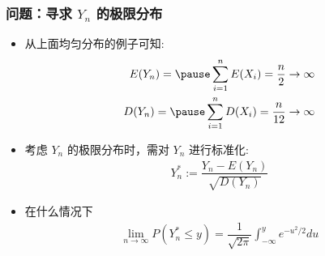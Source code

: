 \begin{frame}
	\frametitle{问题：寻求 $Y_n$ 的极限分布}
	\begin{itemize}[<+-|alert@+>]
		\item 从上面均匀分布的例子可知:
		\begin{eqnarray*}
			E(Y_n)=\pause \sum_{i=1}^nE(X_i)=\dfrac{n}{2}\rightarrow\infty\\
			D(Y_n)=\pause \sum_{i=1}^n D(X_i)=\dfrac{n}{12}\rightarrow\infty
		\end{eqnarray*}
		\item 考虑 $Y_n$ 的极限分布时，需对 $Y_n$ 进行标准化:
		\begin{eqnarray*}
			Y_n^*:=\dfrac{Y_n-E(Y_n)}{\sqrt{D(Y_n)}}
		\end{eqnarray*}
		\item 在什么情况下
		\begin{eqnarray*}
			\lim_{n\rightarrow\infty}P(Y_n^*\le y)=\dfrac{1}{\sqrt{2\pi}}\int_{-\infty}^ye^{-u^2/2}du
		\end{eqnarray*}

	\end{itemize}
\end{frame}

